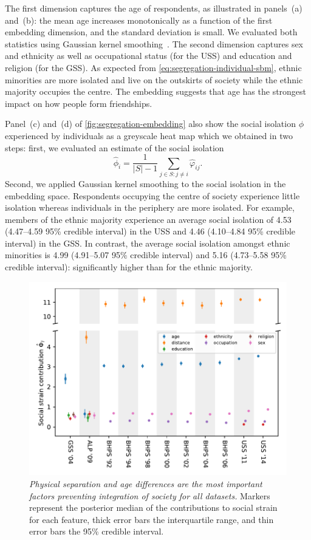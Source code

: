 \documentclass{scrartcl}
\newcommand{\card}[1]{\left|#1\right|}
\newcommand{\titlecaption}[2]{\caption[#1]{\emph{#1} #2}}
\begin{document}
\begin{refsection}
The first dimension captures the age of respondents, as illustrated in panels~(a) and~(b): the mean age increases monotonically as a function of the first embedding dimension, and the standard deviation is small. We evaluated both statistics using Gaussian kernel smoothing~\cite[chapter~6]{Hastie2009}. The second dimension captures sex and ethnicity as well as occupational status (for the USS) and education and religion (for the GSS). As expected from \cref{eq:segregation-individual-sbm}, ethnic minorities are more isolated and live on the outskirts of society while the ethnic majority occupies the centre. The embedding suggests that age has the strongest impact on how people form friendships.

Panel~(c) and~(d) of \cref{fig:segregation-embedding} also show the social isolation $\phi$ experienced by individuals as a greyscale heat map which we obtained in two steps: first, we evaluated an estimate of the social isolation
\begin{equation*}
    \hat\phi_i = \frac{1}{\card{S}-1}\sum_{j\in S:j\neq i} \hat\varphi_{ij}.
\end{equation*}
Second, we applied Gaussian kernel smoothing to the social isolation in the embedding space. Respondents occupying the centre of society experience little isolation whereas individuals in the periphery are more isolated. For example, members of the ethnic majority experience an average social isolation of 4.53 (4.47--4.59 95\% credible interval) in the USS and 4.46 (4.10--4.84 95\% credible interval) in the GSS. In contrast, the average social isolation amongst ethnic minorities is 4.99 (4.91--5.07 95\% credible interval) and 5.16 (4.73--5.58 95\% credible interval): significantly higher than for the ethnic majority.

\begin{figure}
    \includegraphics{segregation}
    \titlecaption{Physical separation and age differences are the most important factors preventing integration of society for all datasets.}{Markers represent the posterior median of the contributions to social strain for each feature, thick error bars the interquartile range, and thin error bars the 95\% credible interval.\label{fig:segregation-survey}}
\end{figure}


\end{refsection}
\end{document}
